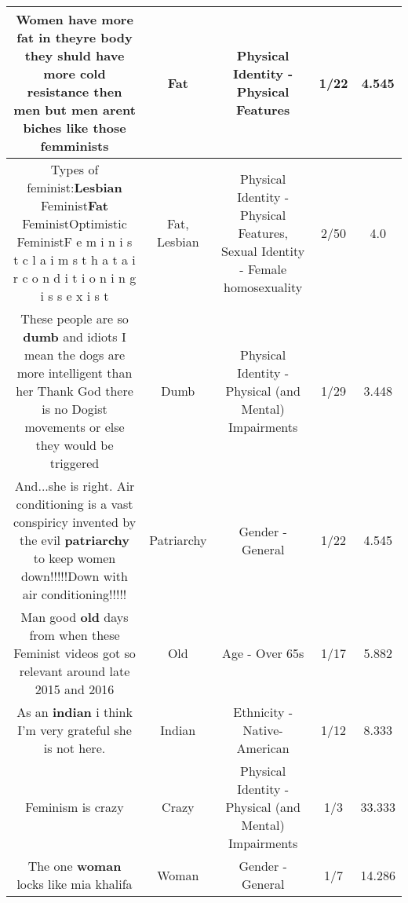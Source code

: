 \documentclass[11pt]{article}
\newlength\mylength
\begin{document}
\begin{center}
\begin{longtable}{|C{.65\mylength}|C{.30\mylength}|C{.12\mylength}|C{.12\mylength}|C{.12\mylength}|}
  \small Women have more \textbf{fat} in theyre body they shuld have more cold resistance then men but men arent biches like those femminists\normalsize   & Fat & Physical Identity - Physical Features & 1/22 & 4.545 \\  \hline
  \small Types of feminist:\textbf{Lesbian} Feminist\textbf{Fat} FeministOptimistic FeministF e m i n i s t c l a i m s t h a t a i r c o n d i t i o n i n g i s s e x i s t\normalsize   & Fat, Lesbian & Physical Identity - Physical Features, Sexual Identity - Female homosexuality & 2/50 & 4.0 \\  \hline
  \small These people are so \textbf{dumb} and idiots I mean the dogs are more intelligent than her Thank God there is no Dogist movements or else they would be triggered\normalsize   & Dumb & Physical Identity - Physical (and Mental) Impairments & 1/29 & 3.448 \\  \hline
  \small And...she is right. Air conditioning is a vast conspiricy invented by the evil \textbf{patriarchy} to keep women down!!!!!Down with air conditioning!!!!!\normalsize   & Patriarchy & Gender - General & 1/22 & 4.545 \\  \hline
  \small Man good \textbf{old} days from when these Feminist videos got so relevant around late 2015 and 2016\normalsize   & Old & Age - Over 65s & 1/17 & 5.882 \\  \hline
  \small As an \textbf{indian} i think I'm very grateful she is not here.\normalsize   & Indian & Ethnicity - Native-American & 1/12 & 8.333 \\  \hline
  \small Feminism is crazy\normalsize   & Crazy & Physical Identity - Physical (and Mental) Impairments & 1/3 & 33.333 \\  \hline
  \small The one \textbf{woman} locks like mia khalifa\normalsize   & Woman & Gender - General & 1/7 & 14.286 \\  \hline

\end{longtable}
\end{center}
\end{document}

